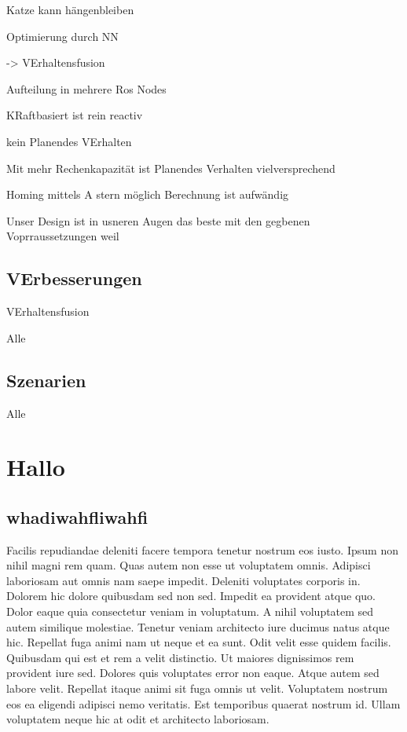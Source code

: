 \documentclass[
a4paper,     %
12pt         %
]{scrartcl}  %
\begin{document}
Katze kann hängenbleiben

Optimierung durch NN

-> VErhaltensfusion

Aufteilung in mehrere Ros Nodes

KRaftbasiert ist rein reactiv

kein Planendes VErhalten

Mit mehr Rechenkapazität ist Planendes Verhalten vielversprechend


Homing mittels A stern möglich
Berechnung ist aufwändig

Unser Design ist in usneren Augen das beste mit den gegbenen Voprraussetzungen weil




\subsection{VErbesserungen}

VErhaltensfusion

Alle
\subsection{Szenarien}
Alle




\section{Hallo}
\subsection{whadiwahfliwahfi}
Facilis repudiandae deleniti facere tempora tenetur nostrum eos iusto. Ipsum non nihil magni rem quam. Quas autem non esse ut voluptatem omnis.
Adipisci laboriosam aut omnis nam saepe impedit. Deleniti voluptates corporis in. Dolorem hic dolore quibusdam sed non sed.
Impedit ea provident atque quo. Dolor eaque quia consectetur veniam in voluptatum. A nihil voluptatem sed autem similique molestiae. Tenetur veniam architecto iure ducimus natus atque hic. Repellat fuga animi nam ut neque et ea sunt. Odit velit esse quidem facilis.
Quibusdam qui est et rem a velit distinctio. Ut maiores dignissimos rem provident iure sed. Dolores quis voluptates error non eaque. Atque autem sed labore velit. Repellat itaque animi sit fuga omnis ut velit.
Voluptatem nostrum eos ea eligendi adipisci nemo veritatis. Est temporibus quaerat nostrum id. Ullam voluptatem neque hic at odit et architecto laboriosam.
\end{document}
